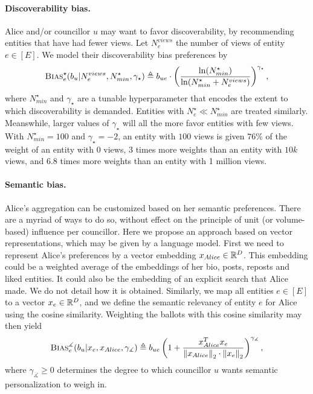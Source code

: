 \paragraph{Discoverability bias.}
Alice and/or councillor $u$ may want to favor discoverability,
by recommending entities that have had fewer views.
Let $N^{views}_e$ the number of views of entity $e \in [E]$.
We model their discoverability bias preferences by
\begin{align}
    \textsc{Bias}_e^{\star} (b_u | N^{views}_e, N^{\star}_{min}, \gamma_\star) \triangleq
    b_{ue} \cdot \left(
        \frac{
            \ln (N^{\star}_{min})
        }{
            \ln (N^{\star}_{min} + N^{views}_e)
        }
    \right)^{\gamma_\star},
\end{align}
where $N^{\star}_{min}$ and $\gamma_\star$ are a tunable hyperparameter 
that encodes the extent to which discoverability is demanded.
Entities with $N^{\star}_e \ll N^\star_{min}$ are treated similarly.
Meanswhile, larger values of $\gamma_\star$ will 
all the more favor entities with few views.
With $N^\star_{min} = 100$ and $\gamma_\star = -2$, 
an entity with $100$ views is given $76\%$ of the weight of an entity with $0$ views,
$3$ times more weights than an entity with $10k$ views,
and $6.8$ times more weights than an entity with 1 million views.

\paragraph{Semantic bias.}
Alice's aggregation can be customized based on her semantic preferences.
There are a myriad of ways to do so, 
without effect on the principle of unit (or volume-based) influence per councillor.
Here we propose an approach based on vector representations,
which may be given by a language model.
First we need to represent Alice's preferences by a vector embedding $x_{Alice} \in \mathbb R^D$.
This embedding could be a weighted average 
of the embeddings of her bio, posts, reposts and liked entities.
It could also be the embedding of an explicit search that Alice made.
We do not detail how it is obtained.
Similarly, we map all entities $e \in [E]$ to a vector $x_e \in \mathbb R^D$,
and we define the semantic relevancy of entity $e$ for Alice 
using the cosine similarity.
Weighting the ballots with this cosine similarity may then yield
\begin{align}
    \textsc{Bias}_e^{\measuredangle} (b_u | x_e, x_{Alice}, \gamma_\measuredangle) 
    \triangleq b_{ue} \left(
        1 + \frac{x_{Alice}^T x_e}{\left\lVert{x_{Alice}}\right\rVert_{2} \cdot \left\lVert{x_e}\right\rVert_{2}}
    \right)^{\gamma_\measuredangle},
\end{align}
where $\gamma_\measuredangle \geq 0$ determines the degree to which 
councillor $u$ wants semantic personalization to weigh in.

